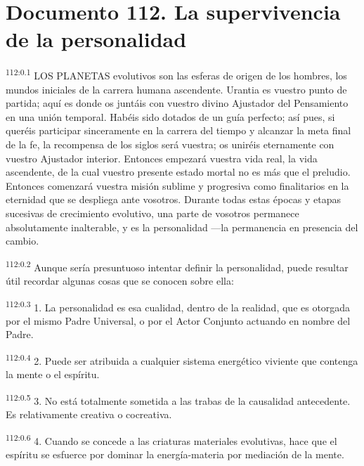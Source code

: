 \chapter{Documento 112. La supervivencia de la personalidad}
\par
\textsuperscript{112:0.1} LOS PLANETAS evolutivos son las esferas de origen de los hombres, los mundos iniciales de la carrera humana ascendente. Urantia es vuestro punto de partida; aquí es donde os juntáis con vuestro divino Ajustador del Pensamiento en una unión temporal. Habéis sido dotados de un guía perfecto; así pues, si queréis participar sinceramente en la carrera del tiempo y alcanzar la meta final de la fe, la recompensa de los siglos será vuestra; os uniréis eternamente con vuestro Ajustador interior. Entonces empezará vuestra vida real, la vida ascendente, de la cual vuestro presente estado mortal no es más que el preludio. Entonces comenzará vuestra misión sublime y progresiva como finalitarios en la eternidad que se despliega ante vosotros. Durante todas estas épocas y etapas sucesivas de crecimiento evolutivo, una parte de vosotros permanece absolutamente inalterable, y es la personalidad ---la permanencia en presencia del cambio.

\par
\textsuperscript{112:0.2} Aunque sería presuntuoso intentar definir la personalidad, puede resultar útil recordar algunas cosas que se conocen sobre ella:

\par
\textsuperscript{112:0.3} 1. La personalidad es esa cualidad, dentro de la realidad, que es otorgada por el mismo Padre Universal, o por el Actor Conjunto actuando en nombre del Padre.

\par
\textsuperscript{112:0.4} 2. Puede ser atribuida a cualquier sistema energético viviente que contenga la mente o el espíritu.

\par
\textsuperscript{112:0.5} 3. No está totalmente sometida a las trabas de la causalidad antecedente. Es relativamente creativa o cocreativa.

\par
\textsuperscript{112:0.6} 4. Cuando se concede a las criaturas materiales evolutivas, hace que el espíritu se esfuerce por dominar la energía-materia por mediación de la mente.

